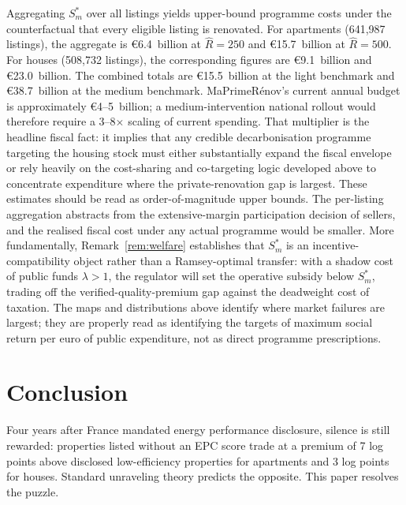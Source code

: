\documentclass[10pt,letterpaper]{bp-template-concise}
\begin{document}
Aggregating $S^*_m$ over all listings yields upper-bound programme costs under the counterfactual that every eligible listing is renovated. For apartments (641{,}987 listings), the aggregate is \euro{}6.4~billion at $\hat{R} = 250$ and \euro{}15.7~billion at $\hat{R} = 500$. For houses (508{,}732 listings), the corresponding figures are \euro{}9.1~billion and \euro{}23.0~billion. The combined totals are \euro{}15.5~billion at the light benchmark and \euro{}38.7~billion at the medium benchmark. MaPrimeRénov's current annual budget is approximately \euro{}4--5~billion; a medium-intervention national rollout would therefore require a 3--8$\times$ scaling of current spending. That multiplier is the headline fiscal fact: it implies that any credible decarbonisation programme targeting the housing stock must either substantially expand the fiscal envelope or rely heavily on the cost-sharing and co-targeting logic developed above to concentrate expenditure where the private-renovation gap is largest. These estimates should be read as order-of-magnitude upper bounds. The per-listing aggregation abstracts from the extensive-margin participation decision of sellers, and the realised fiscal cost under any actual programme would be smaller. More fundamentally, Remark~\ref{rem:welfare} establishes that $S^*_m$ is an incentive-compatibility object rather than a Ramsey-optimal transfer: with a shadow cost of public funds $\lambda > 1$, the regulator will set the operative subsidy below $S^*_m$, trading off the verified-quality-premium gap against the deadweight cost of taxation. The maps and distributions above identify where market failures are largest; they are properly read as identifying the targets of maximum social return per euro of public expenditure, not as direct programme prescriptions.

\section{Conclusion}

Four years after France mandated energy performance disclosure, silence is still rewarded: properties listed without an EPC score trade at a premium of 7 log points above disclosed low-efficiency properties for apartments and 3 log points for houses. Standard unraveling theory predicts the opposite. This paper resolves the puzzle.
\end{document}
